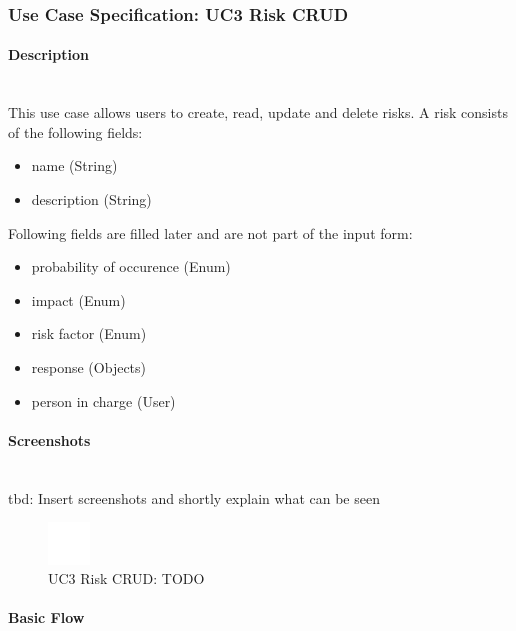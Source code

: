 \newpage
\subsubsection{Use Case Specification: \ac{UC}3 Risk CRUD}
\label{sec:domainBbd}

\paragraph*{Description}\mbox{}\\
This use case allows users to create, read, update and delete risks. 
A risk consists of the following fields:
\begin{itemize}
	\setlength\itemsep{-1.5em}
	\item name (String)
	\item description (String)
\end{itemize}
Following fields are filled later and are not part of the input form:
\begin{itemize}
	\setlength\itemsep{-1.5em}
	\item probability of occurence (Enum)
	\item impact (Enum)
	\item risk factor (Enum)
	\item response (Objects)  
	\item person in charge (User)
\end{itemize}

\paragraph*{Screenshots}\mbox{}\\
tbd: Insert screenshots and shortly explain what can be seen
\begin{figure}[h] 
	\centering
	\includegraphics[width=0.1\textwidth]{Content/Domain/placeholder.png}
	\caption{\ac{UC}3 Risk CRUD: TODO}
	\label{fig:label3}
\end{figure}

\paragraph*{Basic Flow} \mbox{}\\

